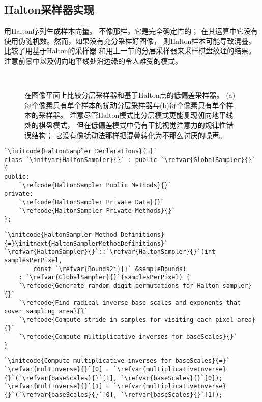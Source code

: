 \subsection{Halton采样器实现}\label{sub:Halton采样器实现}
用Halton序列生成样本向量。
不像那样，它是完全确定性的；
在其运算中它没有使用伪随机数。然而，如果没有充分采样好图像，
则Halton样本可能导致混叠。比较了用基于Halton的采样器
和用上一节的分层采样器来采样棋盘纹理的结果。
注意前景中以及朝向地平线处沿边缘的令人难受的模式。
\begin{figure}[htbp]
    \centering
    \\
    \caption{在图像平面上比较分层采样器和基于Halton点的低偏差采样器。
        (a)每个像素只有单个样本的扰动分层采样器与(b)每个像素只有单个样本的采样器。
        注意尽管Halton模式比分层模式更能复现朝向地平线处的棋盘模式，
        但在低偏差模式中仍有干扰视觉注意力的规律性错误结构；
        它没有像扰动法那样把混叠转化为不那么讨厌的噪声。}
    \label{fig:7.27}
\end{figure}

\begin{lstlisting}
`\initcode{HaltonSampler Declarations}{=}`
class `\initvar{HaltonSampler}{}` : public `\refvar{GlobalSampler}{}` {
public:
    `\refcode{HaltonSampler Public Methods}{}`
private:
    `\refcode{HaltonSampler Private Data}{}`
    `\refcode{HaltonSampler Private Methods}{}`
};
\end{lstlisting}
\begin{lstlisting}
`\initcode{HaltonSampler Method Definitions}{=}\initnext{HaltonSamplerMethodDefinitions}`
`\refvar{HaltonSampler}{}`::`\refvar{HaltonSampler}{}`(int samplesPerPixel,
        const `\refvar{Bounds2i}{}` &sampleBounds)
    : `\refvar{GlobalSampler}{}`(samplesPerPixel) {
    `\refcode{Generate random digit permutations for Halton sampler}{}`
    `\refcode{Find radical inverse base scales and exponents that cover sampling area}{}`
    `\refcode{Compute stride in samples for visiting each pixel area}{}`
    `\refcode{Compute multiplicative inverses for baseScales}{}`
}
\end{lstlisting}
\begin{lstlisting}
`\initcode{Compute multiplicative inverses for baseScales}{=}`
`\refvar{multInverse}{}`[0] = `\refvar{multiplicativeInverse}{}`(`\refvar{baseScales}{}`[1], `\refvar{baseScales}{}`[0]);
`\refvar{multInverse}{}`[1] = `\refvar{multiplicativeInverse}{}`(`\refvar{baseScales}{}`[0], `\refvar{baseScales}{}`[1]);
\end{lstlisting}

